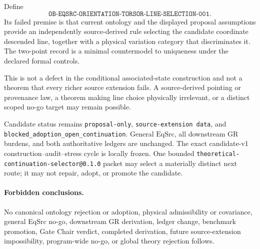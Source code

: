 \documentclass[11pt]{article}
\begin{document}
Define
\[
\texttt{OB-EQSRC-ORIENTATION-TORSOR-LINE-SELECTION-001}.
\]
Its failed premise is that current ontology and the displayed proposal
assumptions provide an independently source-derived rule selecting the
candidate coordinate descended line, together with a physical variation
category that discriminates it. The two-point record is a minimal
countermodel to uniqueness under the declared formal controls.

This is not a defect in the conditional associated-state construction and not
a theorem that every richer source extension fails. A source-derived pointing
or provenance law, a theorem making line choice physically irrelevant, or a
distinct scoped no-go target may remain possible.

Candidate status remains \texttt{proposal-only}, \texttt{source-extension
data}, and \texttt{blocked\_adoption\_open\_continuation}. General
\(\mathrm{EqSrc}\), all downstream GR burdens, and both authoritative ledgers
are unchanged. The exact candidate-v1 construction--audit--stress cycle is
locally frozen. One bounded
\texttt{theoretical-continuation-selector@0.1.0} packet may select a materially
distinct next route; it may not repair, adopt, or promote the candidate.

\paragraph{Forbidden conclusions.}
No canonical ontology rejection or adoption, physical admissibility or
covariance, general EqSrc no-go, downstream GR derivation, ledger change,
benchmark promotion, Gate Chair verdict, completed derivation, future
source-extension impossibility, program-wide no-go, or global theory rejection
follows.
\end{document}
